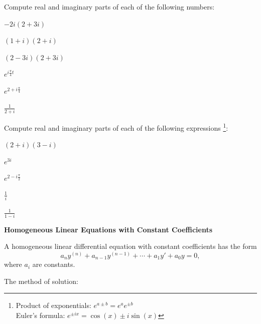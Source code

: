     \begin{question}
      Compute real and imaginary parts of each of the following numbers:
      \begin{colenumerate}[3]
        \item \(-2i(2+3i)\)
        \item \((1+i)(2+i)\)
        \item \((2-3i)(2+3i)\)
        \item \(e^{i \frac{\pi}{4}t}\)
        \item \(e^{2+i \frac{\pi}{4}}\)
        \item \(\frac{1}{2+i}  \)
      \end{colenumerate}
    \end{question}


    \begin{question}
      Compute real and imaginary parts of each of the following expressions
      \footnote{Product of exponentials: \(e^{a\pm b} = e^{a} e^{\pm b}\)\\
        Euler's formula: \(e^{\pm i x} = \cos(x) \pm i \sin (x) \)}:
      \begin{colenumerate}[3]
        \item \( \displaystyle (2+i)(3-i)\) \solspace{.25in}
        \item \( \displaystyle e^{3i}\) \solspace{.25in}
        \item \( \displaystyle e^{2-i\frac{\pi}{2}}\) \solspace{.25in}
        \item \( \displaystyle \frac{1}{i}\) \solspace{.25in}
        \item \( \displaystyle \frac{1}{1-i}\) \solspace{.5in}
      \end{colenumerate}
    \end{question}




  \noindent \textbf{Homogeneous Linear Equations with Constant Coefficients}

  \noindent A homogeneous linear differential equation with constant coefficients has the form
  \[
  a_n y^{(n)} + a_{n-1} y^{(n-1)} + \cdots + a_1 y' + a_0 y = 0,
  \]
  where $a_i$ are constants.

  \noindent The method of solution:

